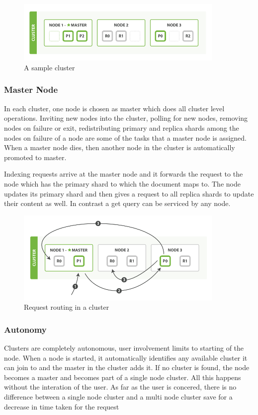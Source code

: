 \documentclass[12pt]{article}
\begin{document}
				\begin{figure}[ht]
					\centering\includegraphics[width=10cm]{images/cluster}
					\caption{A sample cluster}
				\end{figure}

			\subsubsection{Master Node}
				In each cluster, one node is chosen as master which does all cluster level operations. Inviting new nodes into the cluster, polling for new nodes, removing nodes on failure or exit, redistributing primary and replica shards among the nodes on failure of a node are some of the tasks that a master node is assigned. When a master node dies, then another node in the cluster is automatically promoted to master.

				Indexing requests arrive at the master node and it forwards the request to the node which has the primary shard to which the document maps to. The node updates its primary shard and then gives a request to all replica shards to update their content as well. In contrast a get query can be serviced by any node.
				\begin{figure}[ht]
					\centering\includegraphics[width=10cm]{images/cluster_data}
					\caption{Request routing in a cluster}
				\end{figure}

			\subsubsection{Autonomy}
				Clusters are completely autonomous, user involvement limits to starting of the node. When a node is started, it automatically identifies any available cluster it can join to and the master in the cluster adds it. If no cluster is found, the node becomes a master and becomes part of a single node cluster. All this happens without the interation of the user. As far as the user is concered, there is no difference between a single node cluster and a multi node cluster save for a decrease in time taken for the request
\end{document}
